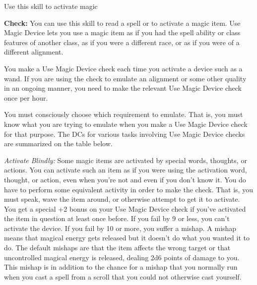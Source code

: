 Use this skill to activate magic

\textbf{Check:} You can use this skill to read a spell or to activate a magic item. Use Magic Device lets you use a magic item as if you had the spell ability or class features of another class, as if you were a different race, or as if you were of a different alignment.

You make a Use Magic Device check each time you activate a device such as a wand. If you are using the check to emulate an alignment or some other quality in an ongoing manner, you need to make the relevant Use Magic Device check once per hour.

You must consciously choose which requirement to emulate. That is, you must know what you are trying to emulate when you make a Use Magic Device check for that purpose. The DCs for various tasks involving Use Magic Device checks are summarized on the table below.


\textit{Activate Blindly:} Some magic items are activated by special words, thoughts, or actions. You can activate such an item as if you were using the activation word, thought, or action, even when you're not and even if you don't know it. You do have to perform some equivalent activity in order to make the check. That is, you must speak, wave the item around, or otherwise attempt to get it to activate. You get a special +2 bonus on your Use Magic Device check if you've activated the item in question at least once before. If you fail by 9 or less, you can't activate the device. If you fail by 10 or more, you suffer a mishap. A mishap means that magical energy gets released but it doesn't do what you wanted it to do. The default mishaps are that the item affects the wrong target or that uncontrolled magical energy is released, dealing 2d6 points of damage to you. This mishap is in addition to the chance for a mishap that you normally run when you cast a spell from a scroll that you could not otherwise cast yourself.

